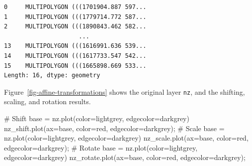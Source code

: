 \documentclass[
  letterpaper,
]{krantz}
\newenvironment{Shaded}{\begin{snugshade}}{\end{snugshade}}
\newcommand{\CommentTok}[1]{\textcolor[rgb]{0.37,0.37,0.37}{#1}}
\newcommand{\NormalTok}[1]{\textcolor[rgb]{0.00,0.23,0.31}{#1}}
\newcommand{\OperatorTok}[1]{\textcolor[rgb]{0.37,0.37,0.37}{#1}}
\newcommand{\StringTok}[1]{\textcolor[rgb]{0.13,0.47,0.30}{#1}}
\begin{document}
\begin{verbatim}
0     MULTIPOLYGON (((1701904.887 597...
1     MULTIPOLYGON (((1779714.772 587...
2     MULTIPOLYGON (((1890843.462 582...
                     ...                
13    MULTIPOLYGON (((1616991.636 539...
14    MULTIPOLYGON (((1617733.547 542...
15    MULTIPOLYGON (((1665898.669 533...
Length: 16, dtype: geometry
\end{verbatim}

Figure~\ref{fig-affine-transformations} shows the original layer
\texttt{nz}, and the shifting, scaling, and rotation results.

\begin{Shaded}
\begin{Highlighting}[]
\CommentTok{\# Shift}
\NormalTok{base }\OperatorTok{=}\NormalTok{ nz.plot(color}\OperatorTok{=}\StringTok{\textquotesingle{}lightgrey\textquotesingle{}}\NormalTok{, edgecolor}\OperatorTok{=}\StringTok{\textquotesingle{}darkgrey\textquotesingle{}}\NormalTok{)}
\NormalTok{nz\_shift.plot(ax}\OperatorTok{=}\NormalTok{base, color}\OperatorTok{=}\StringTok{\textquotesingle{}red\textquotesingle{}}\NormalTok{, edgecolor}\OperatorTok{=}\StringTok{\textquotesingle{}darkgrey\textquotesingle{}}\NormalTok{)}\OperatorTok{;}
\CommentTok{\# Scale}
\NormalTok{base }\OperatorTok{=}\NormalTok{ nz.plot(color}\OperatorTok{=}\StringTok{\textquotesingle{}lightgrey\textquotesingle{}}\NormalTok{, edgecolor}\OperatorTok{=}\StringTok{\textquotesingle{}darkgrey\textquotesingle{}}\NormalTok{)}
\NormalTok{nz\_scale.plot(ax}\OperatorTok{=}\NormalTok{base, color}\OperatorTok{=}\StringTok{\textquotesingle{}red\textquotesingle{}}\NormalTok{, edgecolor}\OperatorTok{=}\StringTok{\textquotesingle{}darkgrey\textquotesingle{}}\NormalTok{)}\OperatorTok{;}
\CommentTok{\# Rotate}
\NormalTok{base }\OperatorTok{=}\NormalTok{ nz.plot(color}\OperatorTok{=}\StringTok{\textquotesingle{}lightgrey\textquotesingle{}}\NormalTok{, edgecolor}\OperatorTok{=}\StringTok{\textquotesingle{}darkgrey\textquotesingle{}}\NormalTok{)}
\NormalTok{nz\_rotate.plot(ax}\OperatorTok{=}\NormalTok{base, color}\OperatorTok{=}\StringTok{\textquotesingle{}red\textquotesingle{}}\NormalTok{, edgecolor}\OperatorTok{=}\StringTok{\textquotesingle{}darkgrey\textquotesingle{}}\NormalTok{)}\OperatorTok{;}
\end{Highlighting}
\end{Shaded}
\end{document}
